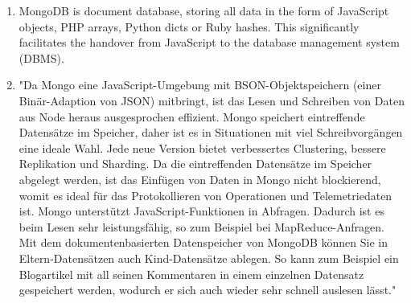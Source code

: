 \begin{enumerate}
\item MongoDB is document database, storing all data in the form of JavaScript objects, PHP arrays, Python dicts or Ruby hashes. This significantly facilitates the handover from JavaScript to the database management system (DBMS).
\item "Da Mongo eine JavaScript-Umgebung mit BSON-Objektspeichern (einer Bin\"ar-Adaption von JSON) mitbringt, ist das Lesen und Schreiben von Daten aus Node heraus ausgesprochen effizient. Mongo speichert eintreffende Datens\"atze im Speicher, daher ist es in Situationen mit viel Schreibvorg\"angen eine ideale Wahl. Jede neue Version bietet verbessertes Clustering, bessere Replikation und Sharding. Da die eintreffenden Datens\"atze im Speicher abgelegt werden, ist das Einf\"ugen von Daten in Mongo nicht blockierend, womit es ideal f\"ur das Protokollieren von Operationen und Telemetriedaten ist. Mongo unterst\"utzt JavaScript-Funktionen in Abfragen. Dadurch ist es beim Lesen sehr leistungsf\"ahig, so zum Beispiel bei MapReduce-Anfragen. Mit dem dokumentenbasierten Datenspeicher von MongoDB k\"onnen Sie in Eltern-Datens\"atzen auch Kind-Datens\"atze ablegen. So kann zum Beispiel ein Blogartikel mit all seinen Kommentaren in einem einzelnen Datensatz gespeichert werden, wodurch er sich auch wieder sehr schnell auslesen l\"asst."  \cite{hughes2012einfuhrung}
\end{enumerate}






